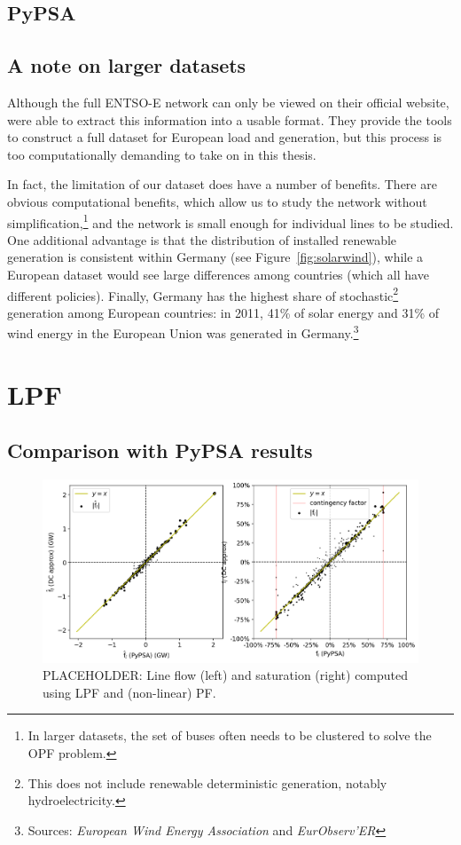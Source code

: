 \documentclass[main.tex]{subfiles}
\begin{document}
\subsection{PyPSA}

\subsection{A note on larger datasets}
Although the full ENTSO-E network can only be viewed on their official website, \cite{PyPSAEUR} were able to extract this information into a usable format. They provide the tools to construct a full dataset for European load and generation, but this process is too computationally demanding to take on in this thesis. 

In fact, the limitation of our dataset does have a number of benefits. There are obvious computational benefits, which allow us to study the network without simplification,\footnote{In larger datasets, the set of buses often needs to be clustered to solve the OPF problem.} and the network is small enough for individual lines to be studied. One additional advantage is that the distribution of installed renewable generation is consistent within Germany (see Figure~\ref{fig:solarwind}), while a European dataset would see large differences among countries (which all have different policies). Finally, Germany has the highest share of stochastic\footnote{This does not include renewable deterministic generation, notably hydroelectricity.} generation among European countries: in 2011, 41\% of solar energy and 31\% of wind energy in the European Union was generated in Germany.\footnote{Sources: \emph{European Wind Energy Association} and \emph{EurObserv’ER}}

\section{LPF}
\subsection{Comparison with PyPSA results}
\begin{figure}
    \centering
    \includegraphics[width=\textwidth]{img/lineflowcorr.png}
    \caption{PLACEHOLDER: Line flow (left) and saturation (right) computed using LPF and (non-linear) PF.}
    \label{fig:generationtech}
\end{figure}
\end{document}
